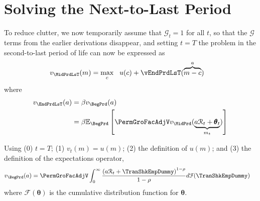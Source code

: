 \documentclass[titlepage, headings=optiontotocandhead]{Resources/texmf-local/tex/latex/econtex}
\begin{document}
\hypertarget{solving-the-next-to-last-period}{}
\hypertarget{solving-the-next}{}
\section{Solving the Next-to-Last Period}\label{sec:solving-the-next}

To reduce clutter, we now temporarily assume that $\mathcal{G}_{t}=1$ for all $t$, so that the $\mathcal{G}$ terms from the earlier derivations disappear, and setting $t=T$ the problem in the second-to-last period of life can now be expressed as
\begin{equation}\begin{gathered}\begin{aligned}
  v_{\MidPrdLsT}(m)  & = \max_{c} ~~ u(c) +
                              \vEndPrdLsT(\overbrace{m-c}^{a})
                              \label{eq:vEndTm1}
\end{aligned}\end{gathered}\end{equation}
where 
\begin{equation*}\begin{gathered}\begin{aligned}
  v_{\EndPrdLsT}(a)  & = \beta v_{\BegPrd}(a) 
\\                          & = \beta {\mathbb{E}}_{\BegPrd} \left[\PermGroFacAdjV v_{\MidPrd}(\underbrace{a \mathcal{R}_{t} + \pmb{\theta}_{t}}_{{m}_{t}})\right]
    \end{aligned}\end{gathered}\end{equation*}



Using (0) $t=T$; (1) $v_{t}(m)=u(m)$; (2) the definition of $u(m)$; and (3) the definition of the expectations operator,  %
\begin{equation}\begin{gathered}\begin{aligned}
      v_{\BegPrd}(a)   & = \PermGroFacAdjV\int_{0}^{\infty} \frac{\left(a \mathcal{R}_{t}+ \TranShkEmpDummy\right)^{1-\rho}}{1-\rho}  d\mathcal{F}(\TranShkEmpDummy) \label{eq:NumDefInt}
    \end{aligned}\end{gathered}\end{equation}
where $\mathcal{F}(\pmb{\theta})$ is the cumulative distribution function for ${\pmb{\theta}}$.
\end{document}
